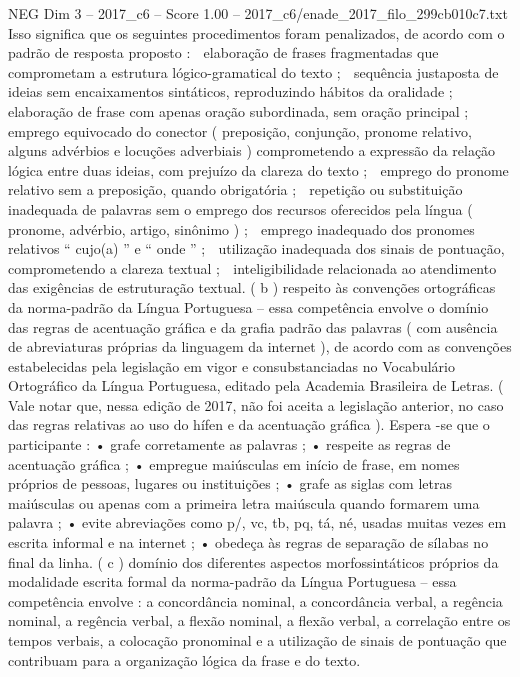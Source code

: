 \begin{textsample}{NEG Dim 3 – 2017\_c6 – Score 1.00 – 2017\_c6/enade\_2017\_filo\_299cb010c7.txt}
Isso significa que os seguintes procedimentos foram penalizados, de acordo com o padrão de resposta proposto :  elaboração de frases fragmentadas que comprometam a estrutura lógico-gramatical do texto ;  sequência justaposta de ideias sem encaixamentos sintáticos, reproduzindo hábitos da oralidade ;  elaboração de frase com apenas oração subordinada, sem oração principal ;  emprego equivocado do conector ( preposição, conjunção, pronome relativo, alguns advérbios e locuções adverbiais ) comprometendo a expressão da relação lógica entre duas ideias, com prejuízo da clareza do texto ;  emprego do pronome relativo sem a preposição, quando obrigatória ;  repetição ou substituição inadequada de palavras sem o emprego dos recursos oferecidos pela língua ( pronome, advérbio, artigo, sinônimo ) ;  emprego inadequado dos pronomes relativos “ cujo(a) ” e “ onde ” ;  utilização inadequada dos sinais de pontuação, comprometendo a clareza textual ;  inteligibilidade relacionada ao atendimento das exigências de estruturação textual. ( b ) respeito às convenções ortográficas da norma-padrão da Língua Portuguesa – essa competência envolve o domínio das regras de acentuação gráfica e da grafia padrão das palavras ( com ausência de abreviaturas próprias da linguagem da internet ), de acordo com as convenções estabelecidas pela legislação em vigor e consubstanciadas no Vocabulário Ortográfico da Língua Portuguesa, editado pela Academia Brasileira de Letras. ( Vale notar que, nessa edição de 2017, não foi aceita a legislação anterior, no caso das regras relativas ao uso do hífen e da acentuação gráfica ).
Espera -se que o participante : • grafe corretamente as palavras ; • respeite as regras de acentuação gráfica ; • empregue maiúsculas em início de frase, em nomes próprios de pessoas, lugares ou instituições ; • grafe as siglas com letras maiúsculas ou apenas com a primeira letra maiúscula quando formarem uma palavra ; • evite abreviações como p/, vc, tb, pq, tá, né, usadas muitas vezes em escrita informal e na internet ; • obedeça às regras de separação de sílabas no final da linha. ( c ) domínio dos diferentes aspectos morfossintáticos próprios da modalidade escrita formal da norma-padrão da Língua Portuguesa – essa competência envolve : a concordância nominal, a concordância verbal, a regência nominal, a regência verbal, a flexão nominal, a flexão verbal, a correlação entre os tempos verbais, a colocação pronominal e a utilização de sinais de pontuação que contribuam para a organização lógica da frase e do texto.

\end{textsample}
